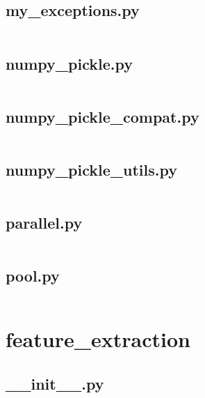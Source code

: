 \documentclass{article}
\begin{document}
\subsection{my\_exceptions.py}
\inputminted{python}{/home/dufferzafar/dev/@clones/scikit-learn/sklearn/externals/joblib/my_exceptions.py}
\newpage

\subsection{numpy\_pickle.py}
\inputminted{python}{/home/dufferzafar/dev/@clones/scikit-learn/sklearn/externals/joblib/numpy_pickle.py}
\newpage

\subsection{numpy\_pickle\_compat.py}
\inputminted{python}{/home/dufferzafar/dev/@clones/scikit-learn/sklearn/externals/joblib/numpy_pickle_compat.py}
\newpage

\subsection{numpy\_pickle\_utils.py}
\inputminted{python}{/home/dufferzafar/dev/@clones/scikit-learn/sklearn/externals/joblib/numpy_pickle_utils.py}
\newpage

\subsection{parallel.py}
\inputminted{python}{/home/dufferzafar/dev/@clones/scikit-learn/sklearn/externals/joblib/parallel.py}
\newpage

\subsection{pool.py}
\inputminted{python}{/home/dufferzafar/dev/@clones/scikit-learn/sklearn/externals/joblib/pool.py}
\newpage

\section{feature\_extraction}

\subsection{\_\_init\_\_.py}
\inputminted{python}{/home/dufferzafar/dev/@clones/scikit-learn/sklearn/feature_extraction/__init__.py}
\newpage
\end{document}
